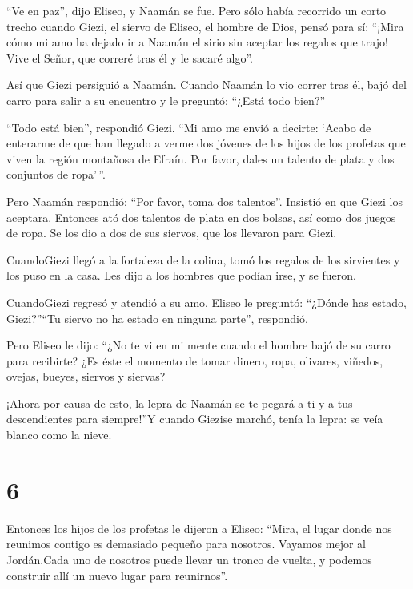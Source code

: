  ``Ve en paz'', dijo Eliseo, y Naamán se fue. Pero sólo
había recorrido un corto trecho  cuando Giezi, el siervo de
Eliseo, el hombre de Dios, pensó para sí: ``¡Mira cómo mi amo ha dejado
ir a Naamán el sirio sin aceptar los regalos que trajo! Vive el Señor,
que correré tras él y le sacaré algo''.

 Así que Giezi persiguió a Naamán. Cuando Naamán lo vio
correr tras él, bajó del carro para salir a su encuentro y le preguntó:
``¿Está todo bien?''

 ``Todo está bien'', respondió Giezi. ``Mi amo me envió a
decirte: `Acabo de enterarme de que han llegado a verme dos jóvenes de
los hijos de los profetas que viven la región montañosa de Efraín. Por
favor, dales un talento de plata y dos conjuntos de ropa'\,''.

 Pero Naamán respondió: ``Por favor, toma dos talentos''.
Insistió en que Giezi los aceptara. Entonces ató dos talentos de plata
en dos bolsas, así como dos juegos de ropa. Se los dio a dos de sus
siervos, que los llevaron para Giezi.

 CuandoGiezi llegó a la fortaleza de la colina, tomó los
regalos de los sirvientes y los puso en la casa. Les dijo a los hombres
que podían irse, y se fueron.

 CuandoGiezi regresó y atendió a su amo, Eliseo le
preguntó: ``¿Dónde has estado, Giezi?''``Tu siervo no ha estado en
ninguna parte'', respondió.

 Pero Eliseo le dijo: ``¿No te vi en mi mente cuando el
hombre bajó de su carro para recibirte? ¿Es éste el momento de tomar
dinero, ropa, olivares, viñedos, ovejas, bueyes, siervos y siervas?

 ¡Ahora por causa de esto, la lepra de Naamán se te pegará
a ti y a tus descendientes para siempre!''Y cuando Giezise marchó, tenía
la lepra: se veía blanco como la nieve.

\hypertarget{section-5}{%
\section{6}\label{section-5}}

 Entonces los hijos de los profetas le dijeron a Eliseo:
``Mira, el lugar donde nos reunimos contigo es demasiado pequeño para
nosotros.  Vayamos mejor al Jordán.Cada uno de nosotros
puede llevar un tronco de vuelta, y podemos construir allí un nuevo
lugar para reunirnos''.

